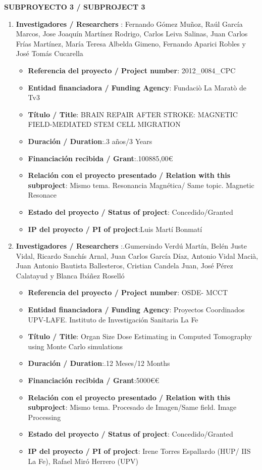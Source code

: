 \noindent\textbf{SUBPROYECTO 3 / SUBPROJECT 3}
 \begin{enumerate}
 \item {\bf Investigadores / Researchers }: Fernando Gómez Muñoz, Raúl García Marcos, Jose Joaquín Martínez Rodrigo, Carlos Leiva Salinas, Juan Carlos Frías Martínez, María Teresa Albelda Gimeno, Fernando Aparici Robles y José Tomás Cucarella
 \begin{itemize}
 \item {\bf Referencia del proyecto / Project number}: 2012\_0084\_CPC
 \item {\bf Entidad financiadora / Funding Agency}: Fundaciò La Maratò de Tv3
 \item {\bf Título / Title}:  BRAIN REPAIR AFTER STROKE: MAGNETIC FIELD-MEDIATED STEM CELL MIGRATION
 \item {\bf Duración / Duration}:.3 años/3 Years 
 \item {\bf Financiación recibida / Grant}:.100885,00\euro  
 \item {\bf Relación con el proyecto presentado / Relation with this subproject}: Mismo tema. Resonancia Magnética/ Same topic. Magnetic Resonace
 \item {\bf Estado del proyecto / Status of project}: Concedido/Granted
 \item {\bf IP del proyecto / PI of project}:Luis Martí Bonmatí 
 \end{itemize}

 \item {\bf Investigadores / Researchers }:.Gumersindo Verdú Martín, Belén Juste Vidal, Ricardo Sanchís Arnal, Juan Carlos García Díaz, Antonio Vidal Macià, Juan Antonio Bautista Ballesteros, Cristian Candela Juan, José Pérez Calatayud y Blanca Ibáñez Roselló
 \begin{itemize}
 \item {\bf Referencia del proyecto / Project number}: OSDE- MCCT
 \item {\bf Entidad financiadora / Funding Agency}: Proyectos Coordinados UPV-LAFE. Instituto de Investigación Sanitaria La Fe
 \item {\bf Título / Title}: Organ Size Dose Estimating in Computed Tomography using Monte Carlo simulations 
 \item {\bf Duración / Duration}:.12 Meses/12 Months
 \item {\bf Financiación recibida / Grant}:5000\euro€
 \item {\bf Relación con el proyecto presentado / Relation with this subproject}: Mismo tema. Procesado de Imagen/Same field. Image Processing
 \item {\bf Estado del proyecto / Status of project}: Concedido/Granted
 \item {\bf IP del proyecto / PI of project}: Irene Torres Espallardo (HUP/ IIS La Fe), Rafael Miró Herrero (UPV)
 \end{itemize}


\end{enumerate}
